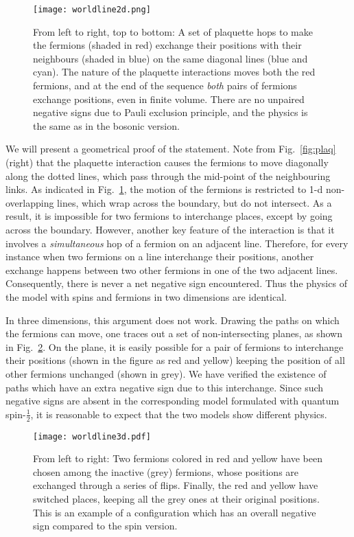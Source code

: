 \documentclass[a4paper,11pt]{article}
\begin{document}
\begin{figure}[!tbh]
 \begin{center}
 \texttt{[image: worldline2d.png]}
 \end{center}
 \caption{ From left to right, top to bottom:  A set of plaquette hops to make the fermions (shaded in red) exchange 
 their positions with their neighbours (shaded in blue) on the same diagonal lines (blue and cyan).
 The nature of the plaquette interactions moves both the red fermions, and at the end
 of the sequence \emph{both} pairs of fermions exchange positions, even in finite volume. There are no unpaired
 negative signs due to Pauli exclusion principle, and the physics is the same as in the bosonic version.}
 \label{fig:worldline2d}
\end{figure}

 We will present a geometrical proof of the statement. Note from Fig.~\ref{fig:plaq} (right) that the plaquette 
interaction causes the fermions to move diagonally along the dotted lines, which pass through the mid-point 
of the neighbouring links. As indicated in Fig.~\ref{fig:worldline2d}, the motion of the fermions is restricted to 
1-d non-overlapping lines, which wrap across the boundary, but do not intersect. As a result, it is 
impossible for two fermions to interchange places, except by going across the boundary. However, another key feature
of the interaction is that it involves a \emph{simultaneous} hop of a fermion on an adjacent line. Therefore, 
for every instance when two fermions on a line interchange their positions, another exchange happens between
two other fermions in one of the two adjacent lines. Consequently, there is never a net negative sign encountered.
Thus the physics of the model with spins and fermions in two dimensions are identical.  

 In three dimensions, this argument does not work. Drawing the paths on which the fermions can move, one
traces out a set of non-intersecting planes, as shown in Fig.~\ref{fig:worldline3d}. On the plane, it is easily
possible for a pair of fermions to interchange their positions (shown in the figure as red and yellow) keeping
the position of all other fermions unchanged (shown in grey). We have verified the existence of paths
which have an extra negative sign due to this interchange. Since such negative signs are absent in the corresponding
model formulated with quantum spin-$\frac{1}{2}$, it is reasonable to expect that the two models show different
physics.

\begin{figure}[!tbh]
 \begin{center}
 \texttt{[image: worldline3d.pdf]}
 \end{center}
 \caption{ From left to right: Two fermions colored in red and yellow have been chosen among the inactive
 (grey) fermions, whose positions are exchanged through a series of flips. Finally, the red and yellow have
 switched places, keeping all the grey ones at their original positions. This is an example of a configuration
 which has an overall negative sign compared to the spin version.}
 \label{fig:worldline3d}
\end{figure}
\end{document}
